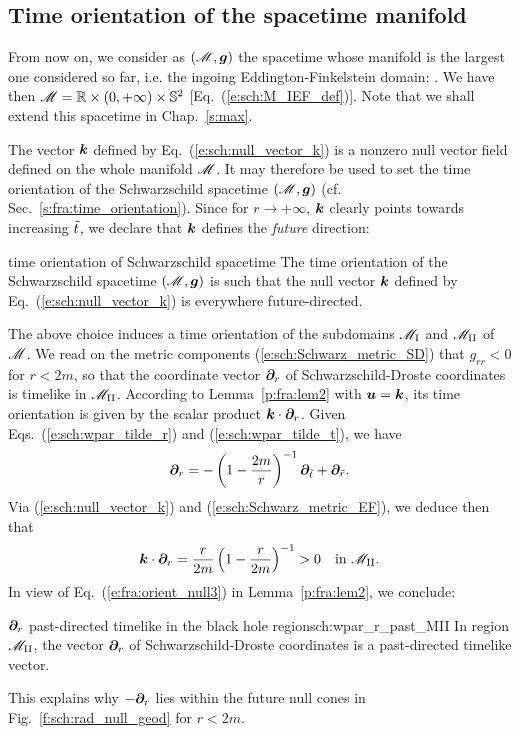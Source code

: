 \subsection{Time orientation of the spacetime manifold} \label{s:sch:time_orientation}

From now on, we consider as
 $(\mathscr{M},\bm{g})$ the spacetime
whose manifold is the largest one considered so far, i.e. the ingoing Eddington-Finkelstein
domain:
\be \label{s:sch:def_Schwarz_spacetime}
   .
\ee
We have then $\mathscr{M} = \mathbb{R}\times(0,+\infty)\times\mathbb{S}^2$ [Eq.~(\ref{e:sch:M_IEF_def})].
Note that we shall extend this spacetime in Chap.~\ref{s:max}.

The vector $\bm{k}$ defined by Eq.~(\ref{e:sch:null_vector_k}) is a nonzero null vector field
defined on the whole manifold
$\mathscr{M}$. It may therefore be used to set the time orientation of the Schwarzschild spacetime $(\mathscr{M},\bm{g})$
(cf. Sec.~\ref{s:fra:time_orientation}). Since for $r\rightarrow+\infty$, $\bm{k}$
clearly points towards increasing ${\tilde t}$, we declare that $\bm{k}$ defines
the \emph{future} direction:
\begin{tprop}{time orientation of Schwarzschild spacetime}{}
The time orientation of the Schwarzschild spacetime $(\mathscr{M}, \bm{g})$ is such
that the null vector $\bm{k}$ defined by Eq.~(\ref{e:sch:null_vector_k})
is everywhere future-directed.
\end{tprop}

The above choice induces a time orientation of the subdomains
$\mathscr{M}_{\rm I}$ and $\mathscr{M}_{\rm II}$ of $\mathscr{M}$.
We read on the metric components (\ref{e:sch:Schwarz_metric_SD}) that $g_{rr} < 0$
for $r< 2m$, so that the coordinate vector
$\bm{\partial}_r$ of Schwarzschild-Droste coordinates is timelike in $\mathscr{M}_{\rm II}$.
According to Lemma~\ref{p:fra:lem2} with $\bm{u}=\bm{k}$,
its time orientation is given by the scalar product $\bm{k}\cdot\bm{\partial}_r$. Given
Eqs.~(\ref{e:sch:wpar_tilde_r}) and (\ref{e:sch:wpar_tilde_t}), we have
\[
    \bm{\partial}_r = - \left( 1 - \frac{2m}{r} \right) ^{-1} \bm{\partial}_{{\tilde t}}
        + \bm{\partial}_{\tilde r} .
\]
Via (\ref{e:sch:null_vector_k}) and (\ref{e:sch:Schwarz_metric_EF}), we deduce
then that
\[
    \bm{k}\cdot\bm{\partial}_r = \frac{r}{2m} \left( 1 - \frac{r}{2m} \right) ^{-1}
    > 0 \quad\mbox{in} \ \mathscr{M}_{\rm II} .
\]
In view of Eq.~(\ref{e:fra:orient_null3}) in Lemma~\ref{p:fra:lem2}, we conclude:

\begin{tprop}{$\bm{\partial}_r$ past-directed timelike in the black hole region}{sch:wpar_r_past_MII}
In region $\mathscr{M}_{\rm II}$, the vector $\bm{\partial}_r$ of Schwarzschild-Droste coordinates
is a past-directed timelike vector.
\end{tprop}
This explains why $-\bm{\partial}_r$ lies within the future null cones
in Fig.~\ref{f:sch:rad_null_geod} for $r<2m$.

